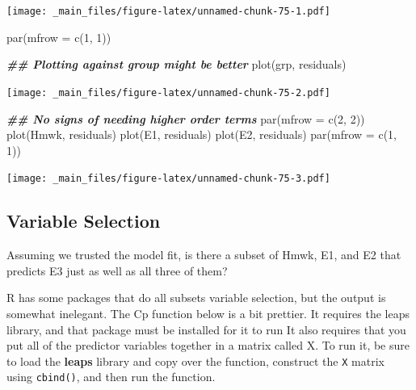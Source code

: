 \documentclass[
]{book}
\newenvironment{Shaded}{\begin{snugshade}}{\end{snugshade}}
\newcommand{\AttributeTok}[1]{\textcolor[rgb]{0.77,0.63,0.00}{#1}}
\newcommand{\DecValTok}[1]{\textcolor[rgb]{0.00,0.00,0.81}{#1}}
\newcommand{\DocumentationTok}[1]{\textcolor[rgb]{0.56,0.35,0.01}{\textbf{\textit{#1}}}}
\newcommand{\FunctionTok}[1]{\textcolor[rgb]{0.00,0.00,0.00}{#1}}
\newcommand{\NormalTok}[1]{#1}
\begin{document}
\texttt{[image: \_main\_files/figure-latex/unnamed-chunk-75-1.pdf]}

\begin{Shaded}
\begin{Highlighting}[]
\FunctionTok{par}\NormalTok{(}\AttributeTok{mfrow =} \FunctionTok{c}\NormalTok{(}\DecValTok{1}\NormalTok{, }\DecValTok{1}\NormalTok{))}

\DocumentationTok{\#\# Plotting against group might be better}
\FunctionTok{plot}\NormalTok{(grp, residuals)}
\end{Highlighting}
\end{Shaded}

\texttt{[image: \_main\_files/figure-latex/unnamed-chunk-75-2.pdf]}

\begin{Shaded}
\begin{Highlighting}[]
\DocumentationTok{\#\# No signs of needing higher order terms}
\FunctionTok{par}\NormalTok{(}\AttributeTok{mfrow =} \FunctionTok{c}\NormalTok{(}\DecValTok{2}\NormalTok{, }\DecValTok{2}\NormalTok{))}
\FunctionTok{plot}\NormalTok{(Hmwk, residuals)}
\FunctionTok{plot}\NormalTok{(E1, residuals)}
\FunctionTok{plot}\NormalTok{(E2, residuals)}
\FunctionTok{par}\NormalTok{(}\AttributeTok{mfrow =} \FunctionTok{c}\NormalTok{(}\DecValTok{1}\NormalTok{, }\DecValTok{1}\NormalTok{))}
\end{Highlighting}
\end{Shaded}

\texttt{[image: \_main\_files/figure-latex/unnamed-chunk-75-3.pdf]}

\hypertarget{variable-selection}{%
\subsection{Variable Selection}\label{variable-selection}}

Assuming we trusted the model fit, is there a subset of Hmwk, E1, and E2 that predicts E3 just as well as all three of them?

R has some packages that do all subsets variable selection, but the output is somewhat inelegant. The Cp function below is a bit prettier. It requires the leaps library, and that package must be installed for it to run It also requires that you put all of the predictor variables together in a matrix called X. To run it, be sure to load the \textbf{leaps} library and copy over the function, construct the \texttt{X} matrix using \texttt{cbind()}, and then run the function.
\end{document}
